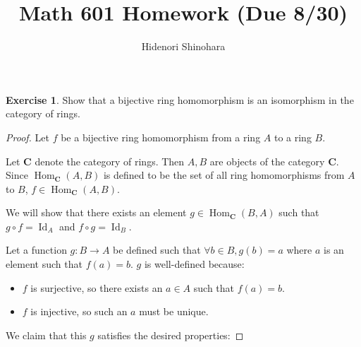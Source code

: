 \documentclass[12pt, psamsfonts]{amsart}
\theoremstyle{definition}
\newtheorem{exer}[thm]{Exercise}
\theoremstyle{remark}
\DeclareMathOperator{\Hom}{Hom}
\DeclareMathOperator{\Id}{Id}
\numberwithin{equation}{section}
\begin{document}
\title{Math 601 Homework (Due 8/30)}
\author{Hidenori Shinohara}
\maketitle

\begin{exer}
  Show that a bijective ring homomorphism is an isomorphism in the category of rings.
\end{exer}

\begin{proof}
Let $f$ be a bijective ring homomorphism from a ring $A$ to a ring $B$.

Let $\mathbf{C}$ denote the category of rings.
Then $A, B$ are objects of the category $\mathbf{C}$.
Since $\Hom_{\mathbf{C}}(A, B)$ is defined to be the set of all ring homomorphisms from $A$ to $B$, $f \in \Hom_{\mathbf{C}}(A, B)$.

We will show that there exists an element $g \in \Hom_{\mathbf{C}}(B, A)$ such that $g \circ f = \Id_A$ and $f \circ g = \Id_B$.

Let a function $g: B \rightarrow A$ be defined such that $\forall b \in B, g(b) = a$ where $a$ is an element such that $f(a) = b$.
$g$ is well-defined because:

\begin{itemize}
  \item
    $f$ is surjective, so there exists an $a \in A$ such that $f(a) = b$.
  \item
    $f$ is injective, so such an $a$ must be unique.
\end{itemize}

We claim that this $g$ satisfies the desired properties:


\end{proof}
\end{document}
